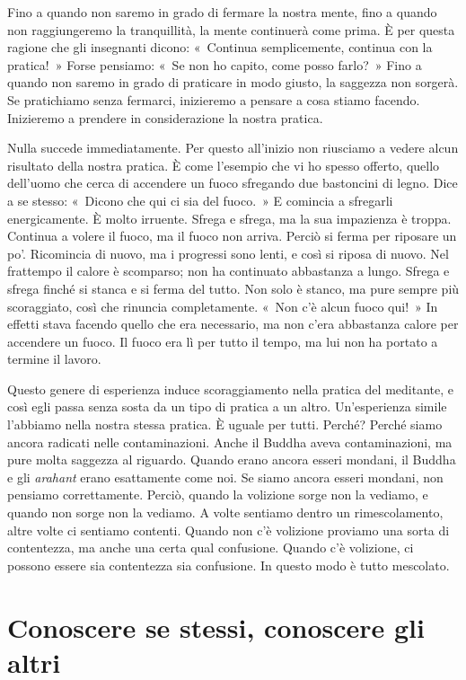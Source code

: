 Fino a quando non saremo in grado di fermare la nostra mente, fino a
quando non raggiungeremo la tranquillità, la mente continuerà come
prima. È per questa ragione che gli insegnanti dicono: «~Continua
semplicemente, continua con la pratica!~» Forse pensiamo: «~Se non ho
capito, come posso farlo?~» Fino a quando non saremo in grado di
praticare in modo giusto, la saggezza non sorgerà. Se pratichiamo senza
fermarci, inizieremo a pensare a cosa stiamo facendo. Inizieremo a
prendere in considerazione la nostra pratica.

Nulla succede immediatamente. Per questo all'inizio non riusciamo a
vedere alcun risultato della nostra pratica. È come l'esempio che vi ho
spesso offerto, quello dell'uomo che cerca di accendere un fuoco
sfregando due bastoncini di legno. Dice a se stesso: «~Dicono che qui ci
sia del fuoco.~» E comincia a sfregarli energicamente. È molto irruente.
Sfrega e sfrega, ma la sua impazienza è troppa. Continua a volere il
fuoco, ma il fuoco non arriva. Perciò si ferma per riposare un po'.
Ricomincia di nuovo, ma i progressi sono lenti, e così si riposa di
nuovo. Nel frattempo il calore è scomparso; non ha continuato abbastanza
a lungo. Sfrega e sfrega finché si stanca e si ferma del tutto. Non solo
è stanco, ma pure sempre più scoraggiato, così che rinuncia
completamente. «~Non c'è alcun fuoco qui!~» In effetti stava facendo
quello che era necessario, ma non c'era abbastanza calore per accendere
un fuoco. Il fuoco era lì per tutto il tempo, ma lui non ha portato a
termine il lavoro.

Questo genere di esperienza induce scoraggiamento nella pratica del
meditante, e così egli passa senza sosta da un tipo di pratica a un
altro. Un'esperienza simile l'abbiamo nella nostra stessa pratica. È
uguale per tutti. Perché? Perché siamo ancora radicati nelle
contaminazioni. Anche il Buddha aveva contaminazioni, ma pure molta
saggezza al riguardo. Quando erano ancora esseri mondani, il Buddha e
gli \emph{arahant} erano esattamente come noi. Se siamo ancora esseri
mondani, non pensiamo correttamente. Perciò, quando la volizione sorge
non la vediamo, e quando non sorge non la vediamo. A volte sentiamo
dentro un rimescolamento, altre volte ci sentiamo contenti. Quando non
c'è volizione proviamo una sorta di contentezza, ma anche una certa qual
confusione. Quando c'è volizione, ci possono essere sia contentezza sia
confusione. In questo modo è tutto mescolato.

\section{Conoscere se stessi, conoscere gli altri}

